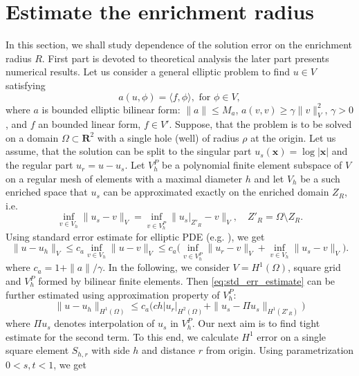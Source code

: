 \documentclass{elsarticle}
\def\vc#1{\mathbf{\boldsymbol{#1}}}     %
\def\abs#1{\left|#1\right|}
\def\norm#1{\| #1 \|}
\def\abs#1{| #1 |}
\newcommand{\R}{\mathbf{R}}
\begin{document}
\section{Estimate the enrichment radius} \label{sec:enrichemnt_radius}
In this section, we shall study dependence of the solution error on the enrichment radius $R$. First part is devoted to 
theoretical analysis the later part presents numerical results.
Let us consider a general elliptic problem to find $u\in V$ satisfying
\[
   a(u, \phi) = \langle f, \phi \rangle, \text{ for } \phi \in V,
\]
where $a$ is bounded elliptic bilinear form: $\norm{a}\le M_a$, $a(v, v) \ge \gamma \norm{v}_V^2$, $\gamma>0$, and $f$ an bounded linear form, $f\in V'$. 
Suppose, that the problem is to be solved on a domain $\Omega \subset \R^2$ with a single hole (well) of radius $\rho$ at the origin. 
Let us assume, that the solution can be split to the singular part $u_s(\vc x)= \log |\vc x|$ and the regular part $u_r=u-u_s$.
Let $V^P_h$ be a polynomial finite element subspace of $V$ on a regular mesh of elements with a maximal diameter $h$
and let $V_h$ be a such enriched space that $u_s$ can be approximated exactly on the enriched domain $Z_R$, i.e.
\[
   \inf_{v\in V_h} \norm{u_s - v}_V = \inf_{v\in V^P_h} \norm{u_s|_{Z'_R} - v}_V, \quad Z'_R = \Omega\setminus Z_R.
\]
Using standard error estimate for elliptic PDE (e.g. \cite[Theorem 13.1]{ciarlet_basic_1991}), we get
\begin{equation}
    \label{eq:std_err_estimate}
    \norm{u - u_h}_{V} \le c_a \inf_{v \in V_h} \norm{u - v}_{V} 
    \le c_a \big(\inf_{v \in V^P_h} \norm{u_r - v}_{V} + \inf_{v \in V_h} \norm{u_s - v}_{V} \big).   
\end{equation}
where $c_a=1+\norm{a}/\gamma$.
In the following, we consider $V=H^1(\Omega)$, square grid and $V^P_h$ formed by bilinear finite elements. 
Then \eqref{eq:std_err_estimate} can be further estimated using approximation property of $V^P_h$:
\begin{equation}
    \label{eq:particular_estimate}
    \norm{u - u_h}_{H^1(\Omega)} \le c_a \big(c h \abs{u_r}_{H^2(\Omega)} + \norm{u_s - \Pi u_s}_{H^1(Z'_R)} \big)   
\end{equation}
where $\Pi u_s$ denotes interpolation of $u_s$ in $V^P_h$. Our next aim is to find tight estimate for the second term.
To this end, we calculate $H^1$ error on a single square element $S_{h,r}$ with side $h$ and distance $r$ from origin.
Using parametrization $0<s,t<1$,  we get
\end{document}
